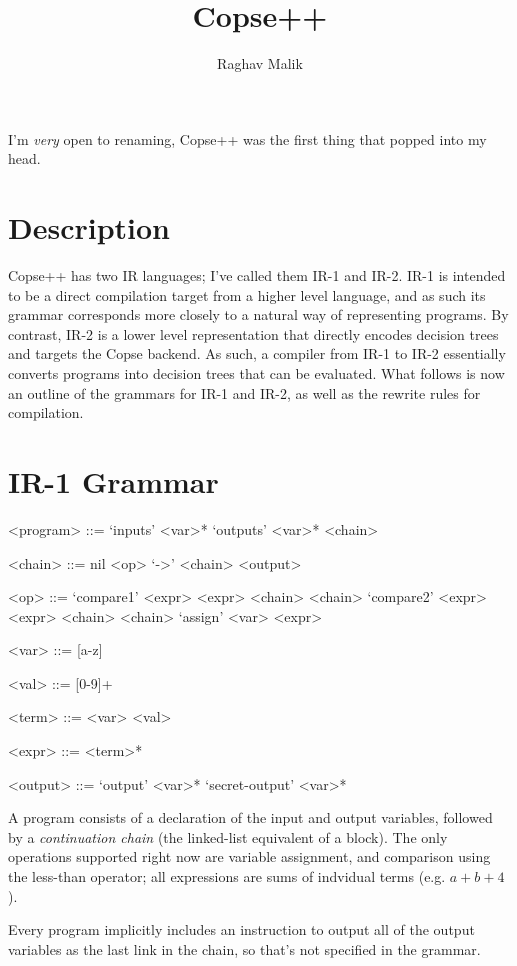 \documentclass{article}
\title{Copse++}
\author{Raghav Malik}
\date{}
\begin{document}
\maketitle
I'm {\em very} open to renaming, Copse++ was the first thing that popped into my head.
\section{Description}
Copse++ has two IR languages; I've called them IR-1 and IR-2.
IR-1 is intended to be a direct compilation target from a higher level language, and as such its grammar corresponds more closely to a natural way of representing programs.
By contrast, IR-2 is a lower level representation that directly encodes decision trees and targets the Copse backend.
As such, a compiler from IR-1 to IR-2 essentially converts programs into decision trees that can be evaluated.
What follows is now an outline of the grammars for IR-1 and IR-2, as well as the rewrite rules for compilation.
\section{IR-1 Grammar}
\begin{grammar}

    <program> ::= `inputs' <var>* `outputs' <var>* <chain>

    <chain> ::= nil \alt <op> `->' <chain> \alt <output>

    <op> ::= `compare1' <expr> <expr> <chain> <chain> \alt
    `compare2' <expr> <expr> <chain> <chain> \alt
    `assign' <var> <expr>

    <var> ::= [a-z]

    <val> ::= [0-9]+

    <term> ::= <var> \alt <val>

    <expr> ::= <term>*

    <output> ::= `output' <var>* \alt `secret-output' <var>*


\end{grammar}
A program consists of a declaration of the input and output variables, followed by a {\em continuation chain} (the linked-list equivalent of a block).
The only operations supported right now are variable assignment, and comparison using the less-than operator; all expressions are sums of indvidual terms (e.g. $a + b + 4$).

Every program implicitly includes an instruction to output all of the output variables as the last link in the chain, so that's not specified in the grammar.
\end{document}
